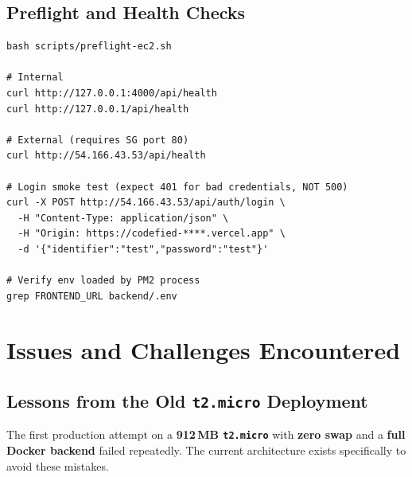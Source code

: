 \documentclass[11pt,a4paper]{article}
\begin{document}
\subsection{Preflight and Health Checks}
\begin{lstlisting}[style=terminal]
bash scripts/preflight-ec2.sh

# Internal
curl http://127.0.0.1:4000/api/health
curl http://127.0.0.1/api/health

# External (requires SG port 80)
curl http://54.166.43.53/api/health

# Login smoke test (expect 401 for bad credentials, NOT 500)
curl -X POST http://54.166.43.53/api/auth/login \
  -H "Content-Type: application/json" \
  -H "Origin: https://codefied-****.vercel.app" \
  -d '{"identifier":"test","password":"test"}'

# Verify env loaded by PM2 process
grep FRONTEND_URL backend/.env
\end{lstlisting}

\section{Issues and Challenges Encountered}

\subsection{Lessons from the Old \texttt{t2.micro} Deployment}
The first production attempt on a \textbf{912\,MB \texttt{t2.micro}} with \textbf{zero swap} and a \textbf{full Docker backend} failed repeatedly. The current architecture exists specifically to avoid these mistakes.
\end{document}
